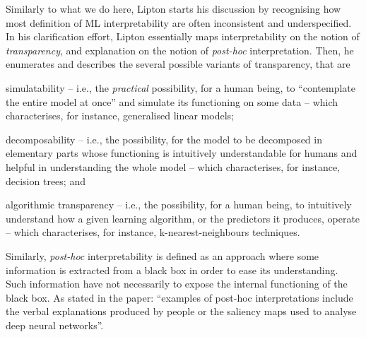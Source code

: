 \documentclass[12pt,a4paper,openright,twoside]{book}
\begin{document}
Similarly to what we do here, Lipton \cite{Lipton18} starts his discussion by recognising how most definition of ML interpretability are often inconsistent and underspecified.
%
In his clarification effort, Lipton essentially maps interpretability on the notion of \emph{transparency}, and explanation on the notion of \emph{post-hoc} interpretation.
%
Then, he enumerates and describes the several possible variants of transparency, that are
%
\begin{inlinelist}
    \item simulatability -- i.e., the \emph{practical} possibility, for a human being, to ``contemplate the entire model at once'' and simulate its functioning on some data  -- which characterises, for instance, generalised linear models;

    \item decomposability -- i.e., the possibility, for the model to be decomposed in elementary parts whose functioning is intuitively understandable for humans and helpful in understanding the whole model -- which characterises, for instance, decision trees; and

    \item algorithmic transparency -- i.e., the possibility, for a human being, to intuitively understand how a given learning algorithm, or the predictors it produces, operate -- which characterises, for instance, k-nearest-neighbours techniques.
\end{inlinelist}
%
Similarly, \emph{post-hoc} interpretability is defined as an approach where some information is extracted from a black box in order to ease its understanding.
%
Such information have not necessarily to expose the internal functioning of the black box.
%
As stated in the paper: ``examples of post-hoc interpretations include the verbal explanations produced by people or the saliency maps used to analyse deep neural networks''.
\end{document}

